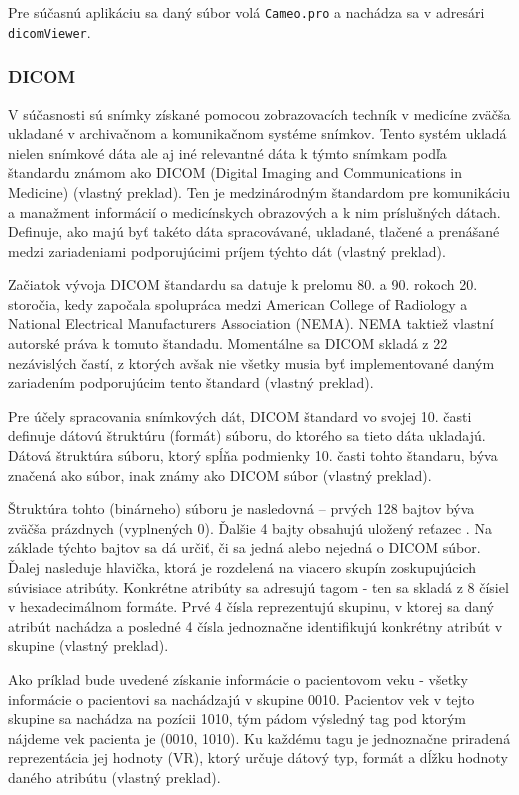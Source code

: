 Pre súčasnú aplikáciu sa daný súbor volá \texttt{Cameo.pro} a nachádza sa v adresári \texttt{dicomViewer}.

\subsubsection {DICOM}\label{dicom}

V súčasnosti sú snímky získané pomocou zobrazovacích techník v medicíne zväčša ukladané v archivačnom a komunikačnom systéme snímkov. Tento systém ukladá nielen snímkové dáta ale aj iné relevantné dáta k týmto snímkam podľa štandardu známom ako DICOM (Digital Imaging and Communications in Medicine) \cite{Varma_2012} (vlastný preklad). Ten je medzinárodným štandardom pre komunikáciu a manažment informácií o medicínskych obrazových a k nim príslušných dátach. Definuje, ako majú byť takéto dáta spracovávané, ukladané, tlačené a prenášané medzi zariadeniami podporujúcimi príjem týchto dát \cite{about_dicomlibrary} (vlastný preklad).

Začiatok vývoja DICOM štandardu sa datuje k prelomu 80. a 90. rokoch 20. storočia, kedy započala spolupráca medzi American College of Radiology a National Electrical Manufacturers Association (NEMA). NEMA taktiež vlastní autorské práva k tomuto štandadu. Momentálne sa DICOM skladá z 22 nezávislých častí, z ktorých avšak nie všetky musia byť implementované daným zariadením podporujúcim tento štandard \cite{dicom_history} (vlastný preklad).

Pre účely spracovania snímkových dát, DICOM štandard vo svojej 10. časti definuje dátovú štruktúru (formát) súboru, do ktorého sa tieto dáta ukladajú. Dátová štruktúra súboru, ktorý spĺňa podmienky 10. časti tohto štandaru, býva značená ako  súbor, inak známy ako DICOM súbor \cite{Varma_2012} (vlastný preklad).

Štruktúra tohto (binárneho) súboru je nasledovná -- prvých 128 bajtov býva zväčša prázdnych (vyplnených 0). Ďalšie 4 bajty obsahujú uložený reťazec .  Na základe týchto bajtov sa dá určiť, či sa jedná alebo nejedná o DICOM súbor.
Ďalej nasleduje hlavička, ktorá je rozdelená na viacero skupín zoskupujúcich súvisiace atribúty. Konkrétne atribúty sa adresujú tagom - ten sa skladá z 8 čísiel v hexadecimálnom formáte. Prvé 4 čísla reprezentujú skupinu, v ktorej sa daný atribút nachádza a posledné 4 čísla jednoznačne identifikujú konkrétny atribút v skupine \cite{Varma_2012} (vlastný preklad).

Ako príklad bude uvedené získanie informácie o pacientovom veku - všetky informácie o pacientovi sa nachádzajú v skupine 0010. Pacientov vek v tejto skupine sa nachádza na pozícii 1010, tým pádom výsledný tag pod ktorým nájdeme vek pacienta je (0010, 1010). Ku každému tagu je jednoznačne priradená reprezentácia jej hodnoty (VR), ktorý určuje dátový typ, formát a dĺžku hodnoty daného atribútu  \cite{Varma_2012} (vlastný preklad).


